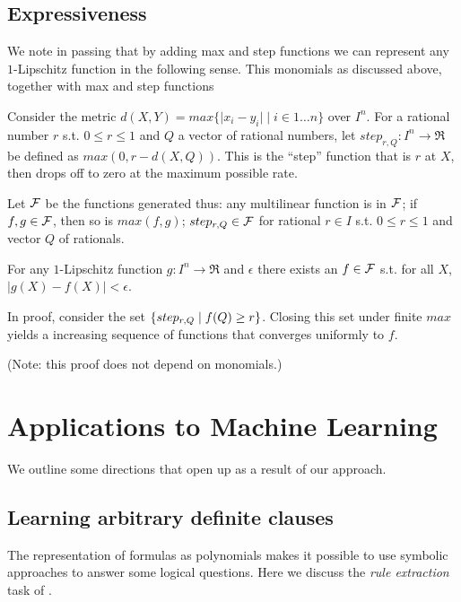 \documentclass{article} %
\begin{document}
\subsection{Expressiveness}
We note in passing that by adding max and step functions we can represent any $1$-Lipschitz function in the following sense. This monomials as discussed above, together with max and step functions

Consider the metric $d(X,Y) = max \{\lvert x_i - y_i \rvert \mid i\in 1\ldots n \}$ over $I^n$. For a 
rational number $r$ s.t. $0 \leq r \leq 1$ and $Q$ a vector of rational numbers, let $step_{r,Q}:I^n \rightarrow \Re$ be defined as
$max(0, r-d(X,Q))$. This is the ``step'' function that is $r$ at $X$, then drops off to zero at the maximum possible rate. 

\begin{definition}
  Let $\cal F$ be the functions generated thus: any multilinear function is in $\cal F$; if $f,g \in {\cal F}$, then so is $max(f,g)$; $step_{r,Q} \in {\cal F}$ for rational $r \in I$ s.t. $0 \leq r \leq 1$ and vector $Q$ of rationals.
\end{definition}

\begin{theorem}
  For any $1$-Lipschitz function $g:I^n \rightarrow \Re$ and $\epsilon$ there exists an $f \in {\cal F}$ s.t. for all $X$, $\lvert g(X)-f(X) \rvert \lt \epsilon$.
\end{theorem}
In proof, consider the set $\{ step_{r,Q} \alt f(Q) \ge r \}$. Closing this set under finite $max$ yields a increasing sequence of functions that converges uniformly to $f$.

(Note: this proof does not depend on monomials.)

\section{Applications to Machine Learning}


We outline some directions that open up as a result of our approach.

\subsection{Learning arbitrary definite clauses}
The representation of formulas as polynomials makes it possible to use symbolic approaches to answer some logical questions. Here we discuss the {\em rule extraction} task of \cite[Algorithm 1]{bishan-iclr15}.
\end{document}
